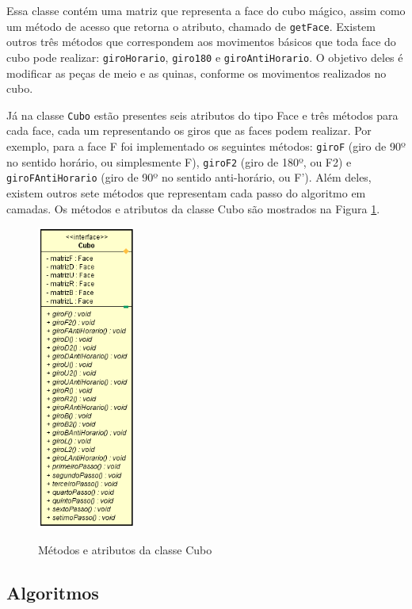 Essa classe contém uma matriz que representa a face do cubo mágico, assim como um método de acesso que retorna o atributo, chamado de {\tt getFace}. Existem outros três métodos que correspondem aos movimentos básicos que toda face do cubo pode realizar: {\tt giroHorario}, {\tt giro180} e {\tt giroAntiHorario}. O objetivo deles é modificar as peças de meio e as quinas, conforme os movimentos realizados no cubo.  


Já na classe {\tt Cubo} estão presentes seis atributos do tipo Face e três métodos para cada face, cada um representando os giros que as faces podem realizar. Por exemplo, para a face F foi implementado os seguintes métodos: {\tt giroF} (giro de 90º no sentido horário, ou simplesmente F), {\tt giroF2} (giro de 180º, ou F2) e {\tt giroFAntiHorario} (giro de 90º no sentido anti-horário, ou F’). Além deles, existem outros sete métodos que representam cada passo do algoritmo em camadas. Os métodos e atributos da classe Cubo são mostrados na Figura \ref{fig:figInterfaceCubo}.
\begin{figure}[!htb]
    \centering
    {
        \includegraphics[height=10cm]{imagens/Cubo.png}
        \label{figFront}
    }
    
\caption{Métodos e atributos da classe Cubo}
\label{fig:figInterfaceCubo}
\end{figure}

\subsection{Algoritmos}


